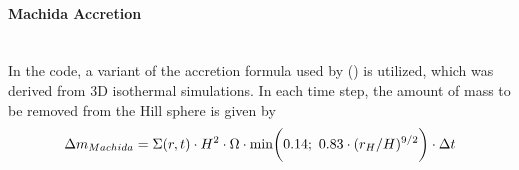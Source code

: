       \paragraph{Machida Accretion} \ \\
      In the code, a variant of the accretion formula used by 
      \citeauthor{Machida_2010} (\citeyear{Machida_2010}) is utilized, which 
      was derived from 3D isothermal simulations.
      In each time 
      step, the amount of mass to be removed from the Hill sphere is given by 
      \begin{equation}
        \Delta m_{Machida}=\Sigma(r,t)\cdot H^2\cdot\Omega\cdot \textnormal{min}
        \bigg(0.14;\ 0.83\cdot(r_H/H)^{9/2}\bigg)\cdot\Delta t
        \label{eq:machida_accretion}
      \end{equation}

      \newpage
